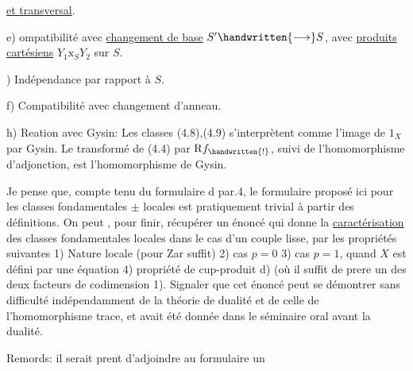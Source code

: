 
\uline{et transversal}.

e) ompatibilité avec \uline{changement de base} $S'\handwritten{\longrightarrow}S$, avec \uline{produits cartésiens} $Y_1\mathbin{\mathrm{x}}_S Y_2$ sur $S$.

) Indépendance par rapport à $S$. 

f) Compatibilité avec changement d'anneau.

h) Reation avec Gysin: Les classes (4.8),(4.9) s'interprètent comme l'image de $1_X$ par Gysin. Le transformé de (4.4) par $\mathrm{R}f_{\handwritten{!}}$, suivi de l'homomorphisme d'adjonction, est l'homomorphisme de Gysin.

Je pense que, compte tenu du formulaire d par.4, le formulaire  proposé ici pour les classes fondamentales $\pm$ locales est pratiquement trivial à partir des définitions. On peut , pour finir, récupérer un énoncé qui donne la \uline{caractérisation} des classes fondamentales locales dans le cas d'un couple lisse, par les propriétés suivantes 1) Nature locale (pour Zar suffit) 2) cas $p=0$ 3) cas $p=1$, quand $X$ est défini par une équation 4) propriété de cup-produit d) (où il suffit de prere un des deux facteurs de codimension 1). Signaler que cet énoncé\deleted{\unsure{,|(}} peut se démontrer sans difficulté indépendamment de la théorie de dualité et de celle de l'homomorphisme trace, et avait été donnée dans le séminaire oral  avant la dualité.

Remords: il serait prent d'adjoindre au formulaire un

